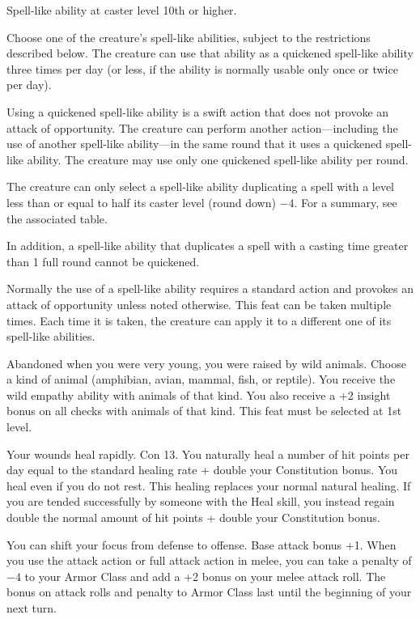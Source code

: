 {}
{Spell-like ability at caster level 10th or higher.}
{Choose one of the creature's spell-like abilities, subject to the restrictions described below. The creature can use that ability as a quickened spell-like ability three times per day (or less, if the ability is normally usable only once or twice per day).

Using a quickened spell-like ability is a swift action that does not provoke an attack of opportunity. The creature can perform another action---including the use of another spell-like ability---in the same round that it uses a quickened spell-like ability. The creature may use only one quickened spell-like ability per round.

The creature can only select a spell-like ability duplicating a spell with a level less than or equal to half its caster level (round down) $-4$. For a summary, see the associated table.

In addition, a spell-like ability that duplicates a spell with a casting time greater than 1 full round cannot be quickened.}
{Normally the use of a spell-like ability requires a standard action and provokes an attack of opportunity unless noted otherwise.}
{This feat can be taken multiple times. Each time it is taken, the creature can apply it to a different one of its spell-like abilities.}

{Abandoned when you were very young, you were raised by wild animals.}{}
{Choose a kind of animal (amphibian, avian, mammal, fish, or reptile). You receive the wild empathy ability with animals of that kind. You also receive a +2 insight bonus on all  checks with animals of that kind.}{}
{This feat must be selected at 1st level.}

{Your wounds heal rapidly.}
{Con 13.}
{You naturally heal a number of hit points per day equal to the standard healing rate + double your Constitution bonus. You heal even if you do not rest. This healing replaces your normal natural healing. If you are tended successfully by someone with the Heal skill, you instead regain double the normal amount of hit points + double your Constitution bonus.}{}{}

{You can shift your focus from defense to offense.}
{Base attack bonus +1.}
{When you use the attack action or full attack action in melee, you can take a penalty of $-4$ to your Armor Class and add a +2 bonus on your melee attack roll. The bonus on attack rolls and penalty to Armor Class last until the beginning of your next turn.}{}{}

